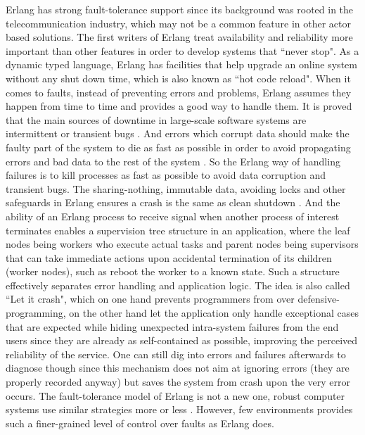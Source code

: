 Erlang has strong fault-tolerance support since its background was rooted in the telecommunication industry, which may not be a common feature in other actor based solutions. The first writers of Erlang treat availability and reliability more important than other features in order to develop systems that ``never stop". As a dynamic typed language, Erlang has facilities that help upgrade an online system without any shut down time, which is also known as ``hot code reload". When it comes to faults, instead of preventing errors and problems, Erlang assumes they happen from time to time and provides a good way to handle them. It is proved that the main sources of downtime in large-scale software systems are intermittent or transient bugs \autocite{candea2003crash}. And errors which corrupt data should make the faulty part of the system to die as fast as possible in order to avoid propagating errors and bad data to the rest of the system \autocite{learn_you_some_erlang}. So the Erlang way of handling failures is to kill processes as fast as possible to avoid data corruption and transient bugs. The sharing-nothing, immutable data, avoiding locks and other safeguards in Erlang ensures a crash is the same as clean shutdown \autocite{learn_you_some_erlang}. And the ability of an Erlang process to receive signal when another process of interest terminates enables a supervision tree structure in an application, where the leaf nodes being workers who execute actual tasks and parent nodes being supervisors that can take immediate actions upon accidental termination of its children (worker nodes), such as reboot the worker to a known state. Such a structure effectively separates error handling and application logic. The idea is also called ``Let it crash",  which on one hand prevents programmers from over defensive-programming, on the other hand let the application only handle exceptional cases that are expected while hiding unexpected intra-system failures from the end users since they are already as self-contained as possible, improving the perceived reliability of the service. One can still dig into errors and failures afterwards to diagnose though since this mechanism does not aim at ignoring errors (they are properly recorded anyway) but saves the system from crash upon the very error occurs. The fault-tolerance model of Erlang is not a new one, robust computer systems use similar strategies more or less \autocite{gray1986computers}. However, few environments provides such a finer-grained level of control over faults as Erlang does.

